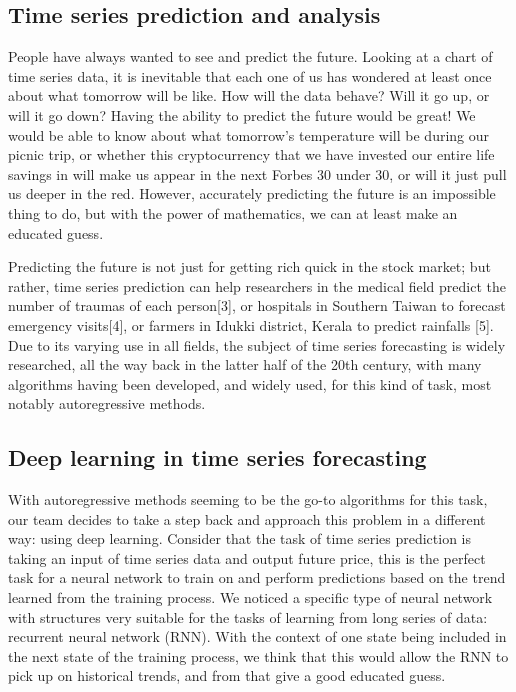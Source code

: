 \documentclass[letterpaper, 10 pt, conference]{ieeeconf}  %
\begin{document}
\subsection{Time series prediction and analysis}
    People have always wanted to see and predict the future. Looking at a chart of time series data, it is inevitable that each one of us has wondered at least once about what tomorrow will be like. How will the data behave? Will it go up, or will it go down? Having the ability to predict the future would be great! We would be able to know about what tomorrow's temperature will be during our picnic trip, or whether this cryptocurrency that we have invested our entire life savings in will make us appear in the next Forbes 30 under 30, or will it just pull us deeper in the red. However, accurately predicting the future is an impossible thing to do, but with the power of mathematics, we can at least make an educated guess.
            
    Predicting the future is not just for getting rich quick in the stock market; but rather, time series prediction can help researchers in the medical field predict the number of traumas of each person[3], or hospitals in Southern Taiwan to forecast emergency visits[4], or farmers in Idukki district, Kerala to predict rainfalls [5]. Due to its varying use in all fields, the subject of time series forecasting is widely researched, all the way back in the latter half of the 20th century, with many algorithms having been developed, and widely used, for this kind of task, most notably autoregressive methods.

\subsection{Deep learning in time series forecasting}
    With autoregressive methods seeming to be the go-to algorithms for this task, our team decides to take a step back and approach this problem in a different way: using deep learning. Consider that the task of time series prediction is taking an input of time series data and output future price, this is the perfect task for a neural network to train on and perform predictions based on the trend learned from the training process. We noticed a specific type of neural network with structures very suitable for the tasks of learning from long series of data: recurrent neural network (RNN). With the context of one state being included in the next state of the training process, we think that this would allow the RNN to pick up on historical trends, and from that give a good educated guess.
\end{document}

